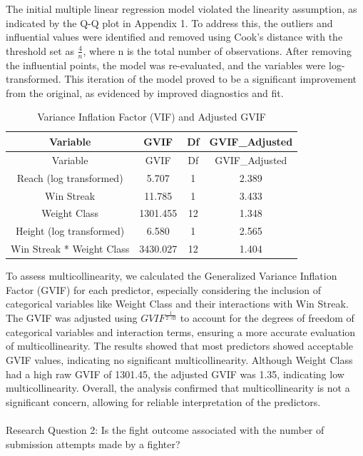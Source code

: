 \documentclass[
  letterpaper,
  DIV=11,
  numbers=noendperiod]{scrartcl}
\makeatletter
\let\oldparagraph\paragraph
\renewcommand{\paragraph}{
    \@ifstar
      \xxxParagraphStar
      \xxxParagraphNoStar
  }
\newcommand{\xxxParagraphStar}[1]{\oldparagraph*{#1}\mbox{}}
\newcommand{\xxxParagraphNoStar}[1]{\oldparagraph{#1}\mbox{}}
\makeatother
\begin{document}
The initial multiple linear regression model violated the linearity
assumption, as indicated by the Q-Q plot in Appendix 1. To address this,
the outliers and influential values were identified and removed using
Cook's distance with the threshold set as \(\frac{4}{n}\), where n is
the total number of observations. After removing the influential points,
the model was re-evaluated, and the variables were log-transformed. This
iteration of the model proved to be a significant improvement from the
original, as evidenced by improved diagnostics and fit.

\begin{longtable}[]{@{}cccc@{}}
\caption{Variance Inflation Factor (VIF) and Adjusted
GVIF}\tabularnewline
\toprule\noalign{}
Variable & GVIF & Df & GVIF\_Adjusted \\
\midrule\noalign{}
\endfirsthead
\toprule\noalign{}
Variable & GVIF & Df & GVIF\_Adjusted \\
\midrule\noalign{}
\endhead
\bottomrule\noalign{}
\endlastfoot
Reach (log transformed) & 5.707 & 1 & 2.389 \\
Win Streak & 11.785 & 1 & 3.433 \\
Weight Class & 1301.455 & 12 & 1.348 \\
Height (log transformed) & 6.580 & 1 & 2.565 \\
Win Streak * Weight Class & 3430.027 & 12 & 1.404 \\
\end{longtable}

To assess multicollinearity, we calculated the Generalized Variance
Inflation Factor (GVIF) for each predictor, especially considering the
inclusion of categorical variables like Weight Class and their
interactions with Win Streak. The GVIF was adjusted using
\(GVIF^{\frac{1}{2 \cdot \text{df}}}\) to account for the degrees of
freedom of categorical variables and interaction terms, ensuring a more
accurate evaluation of multicollinearity. The results showed that most
predictors showed acceptable GVIF values, indicating no significant
multicollinearity. Although Weight Class had a high raw GVIF of 1301.45,
the adjusted GVIF was 1.35, indicating low multicollinearity. Overall,
the analysis confirmed that multicollinearity is not a significant
concern, allowing for reliable interpretation of the predictors.

\paragraph{Research Question 2: Is the fight outcome associated with the
number of submission attempts made by a
fighter?}\label{research-question-2-is-the-fight-outcome-associated-with-the-number-of-submission-attempts-made-by-a-fighter}
\end{document}
